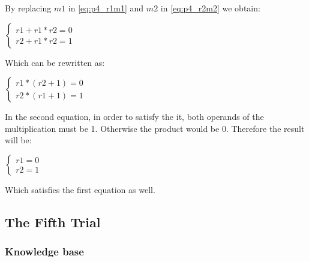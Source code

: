 By replacing $m1$ in \ref{eq:p4_r1m1} and $m2$ in \ref{eq:p4_r2m2} we obtain:


\begin{center}
\begin{math}
\begin{cases}
 r1 + r1 * r2 = 0\\
 r2 + r1 * r2 = 1
 \end{cases}
\end{math} 
\end{center}

Which can be rewritten as: 

\begin{center}
\begin{math}
\begin{cases}
 r1 * (r2 + 1) = 0\\
 r2 * (r1 + 1) = 1
 \end{cases}
\end{math} 
\end{center}


In the second equation, in order to satisfy the it, both operands of the multiplication must be 1. Otherwise the product would be 0. Therefore the result will be:

\begin{center}
\begin{math}
\begin{cases}
 r1 = 0\\
 r2 = 1
\end{cases}
\end{math} 
\end{center}

Which satisfies the first equation as well.







\subsection{The Fifth Trial}

\subsubsection{Knowledge base}

